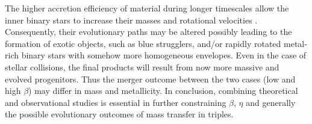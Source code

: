 The higher accretion efficiency of material during longer timescales allow the inner binary stars to increase their masses and rotational velocities \cite{packet1981rotation}. Consequently, their evolutionary paths may be altered possibly leading to the formation of exotic objects, such as blue strugglers, and/or rapidly rotated metal-rich binary stars with somehow more homogeneous envelopes. Even in the case of stellar collisions, the final products will result from now more massive and evolved progenitors. Thus the merger outcome between the two cases (low and high $\beta$) may differ in mass and metallicity. In conclusion, combining theoretical and observational studies is essential in further constraining $\beta$, $\eta$ and generally the possible evolutionary outcomes of mass transfer in triples.



